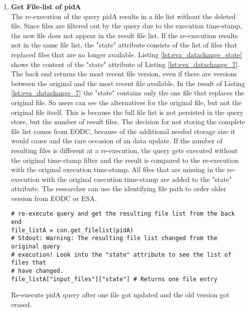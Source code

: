 \documentclass[draft,final]{vutinfth} %
\newenvironment{code}{\captionsetup{type=listing}}{}
\begin{document}
\begin{enumerate}
	\item \textbf{Get File-list of pidA}\\ 
The re-execution of the query pidA results in a file list without the deleted file. Since files are filtered out by the query due to the execution time-stamp, the new file does not appear in the result file list. If the re-execution results not in the same file list, the "state" attribute consists of the list of files that replaced files that are no longer available. Listing \ref{lst:eva_datachange_state} shows the content of the "state" attribute of Listing \ref{lst:eva_datachange_7}. The back end returns the most recent file version, even if there are versions between the original and the most recent file available. In the result of Listing \ref{lst:eva_datachange_7} the "state" contains only the one file that replaces the original file. So users can see the alternatives for the original file, but not the original file itself. This is because the full file list is not persisted in the query store, but the number of result files. The decision for not storing the complete file list comes from EODC, because of the additional needed storage size it would cause and the rare occasion of an data update. If the number of resulting files is different at a re-execution, the query gets executed without the original time-stamp filter and the result is compared to the re-execution with the original execution time-stamp. All files that are missing in the re-execution with the original execution time-stamp are added to the "state" attribute. The researcher can use the identifying file path to order older version from EODC or ESA.   
	\begin{code}
	\begin{verbatim}
# re-execute query and get the resulting file list from the back end
file_listA = con.get_filelist(pidA)
# Stdout: Warning: The resulting file list changed from the original query
# execution! Look into the "state" attribute to see the list of files that
# have changed. 
file_listA["input_files"]["state"] # Returns one file entry
	\end{verbatim}
	\caption{Re-execute pidA query after one file got updated and the old version got erased.}
	\label{lst:eva_datachange_7}
	\end{code}	
	


\end{enumerate}
\end{document}
